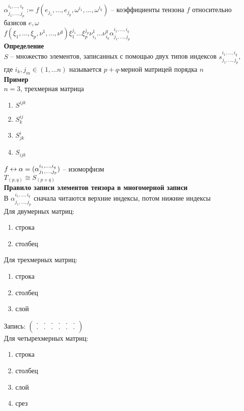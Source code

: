 \documentclass[12pt]{article}
\begin{document}
$\alpha_{j_1, \ldots, j_p}^{i_1, \ldots, i_q} := f(e_{j_1}, \ldots, e_{j_p},\omega^{i_1}, \ldots, \omega^{i_q})$ -- коэффициенты тензона $f$ относительно базисов $e, \omega$\\
$f(\xi_1, \ldots, \xi_p, \nu^1, \ldots, \nu^q)\xi_1^{j_1}\ldots\xi_p^{j_p}\nu^1_{i_1}\ldots\nu^q_{i_q}\alpha_{j_1, \ldots, j_p}^{i_1, \ldots, i_q}$\\
\textbf{Определение}\\
$S$ -- множество элементов, записанных с помощью двух типов индексов $s_{j_1, \ldots, j_p}^{i_1, \ldots, i_q}$, где $i_k, j_m \in (1,\ldots n)$ называется $p+q$-мерной матрицей порядка $n$\\
\textbf{Пример}\\
$n = 3$, трехмерная матрица
\begin{enumerate}
    \item $S^{ijk}$
    \item $S^{ij}_k$
    \item $S^i_{jk}$
    \item $S_{ijk}$
\end{enumerate}
$f \leftrightarrow \alpha = (\alpha_{j_1, \ldots, j_p}^{i_1, \ldots, i_q})$ -- изоморфизм\\
$T_{(p,q)} \cong S_(p+q)$\\
\textbf{Правило записи элементов тензора в многомерной записи}\\
В $\alpha_{j_1, \ldots, j_p}^{i_1, \ldots, i_q}$ сначала читаются верхние индексы, потом нижние индексы\\
Для двумерных матриц:
\begin{enumerate}
    \item строка
    \item столбец
\end{enumerate}
Для трехмерных матриц:
\begin{enumerate}
    \item строка
    \item столбец
    \item слой
\end{enumerate}
Запись: $\left(\begin{array}{cc|cc|cc}
    \cdot & \cdot & \cdot & \cdot & \cdot & \cdot\\
    \cdot & \cdot & \cdot & \cdot & \cdot & \cdot
\end{array}\right)$\\
Для четырехмерных матриц:
\begin{enumerate}
    \item строка
    \item столбец
    \item слой
    \item срез
\end{enumerate}
\end{document}
